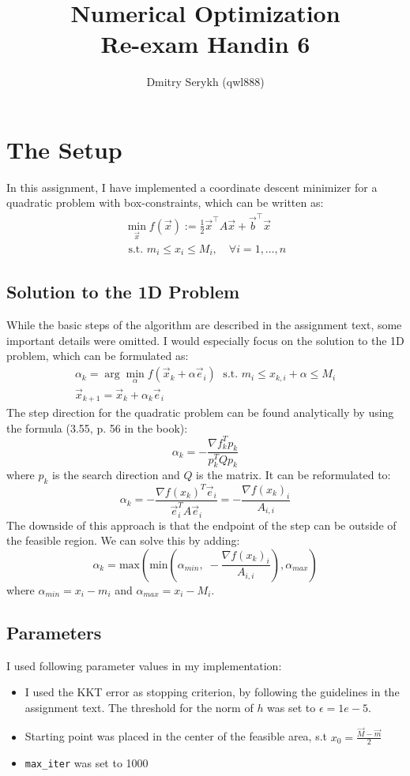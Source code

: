 \documentclass[a4paper]{article}
\title{\vspace{-5cm} Numerical Optimization \\ Re-exam Handin 6}
\author{Dmitry Serykh (qwl888)}
\begin{document}
\maketitle
\section{The Setup}
In this assignment, I have implemented a coordinate descent minimizer for a quadratic problem with
box-constraints, which can be written as:
\[
\begin{array}{l}
  \min _{\vec{x}} f(\vec{x}):=\frac{1}{2} \vec{x}^{\top} A \vec{x}+\vec{b}^{\top} \vec{x} \\
  \text { s.t. } m_{i} \leq x_{i} \leq M_{i}, \quad \forall i=1, \ldots, n
\end{array}
\]

\subsection{Solution to the 1D Problem}
While the basic steps of the algorithm are described in the assignment text,
some important details were omitted. I would especially focus on the solution to
the 1D problem, which can be formulated as:
\[
\begin{array}{l}
\alpha_k = \arg \min_\alpha f(\vec x_k + \alpha \vec e_i)\; \text{ s.t. }m_i\leq x_{k,i} + \alpha \leq M_i\\
\vec x_{k+1} =\vec x_k + \alpha_k \vec e_i
\end{array}
\]
The step direction for the quadratic problem can be found analytically by using
the formula (3.55, p. 56 in the book):
\[
\alpha_{k}=-\frac{\nabla f_{k}^{T} p_{k}}{p_{k}^{T} Q p_{k}}
\]
where $p_k$ is the search direction and $Q$ is the matrix. It can be
reformulated to:
\[
\alpha_{k}=-\frac{\nabla f(x_k)^{T} \vec{e}_{i}}{\vec{e}_{i}^{T} A \vec{e}_i}= -\frac{\nabla f(x_k)_i}{A_{i,i}}
\]
The downside of this approach is that the endpoint of the step can be outside of
the feasible region. We can solve this by adding:
\[
\alpha_{k}=\text{max}\left(\text{min}\left(\alpha_{min},\; -\frac{\nabla f(x_k)_i}{A_{i,i}}\right), \alpha_{max}\right)
\]
where $\alpha_{min} = x_i - m_i$ and $\alpha_{max} = x_i - M_i$.

\subsection{Parameters}
I used following parameter values in my implementation:
\begin{itemize}
\item I used the KKT error as stopping criterion, by following the guidelines in
  the assignment text. The threshold for the norm of $h$ was set to $\epsilon = 1e-5$.
\item Starting point was placed in the center of the feasible area, s.t
  $x_0 = \frac{\vec{M} - \vec{m}}{2}$
\item \texttt{max\_iter} was set to 1000
\end{itemize}
\end{document}
